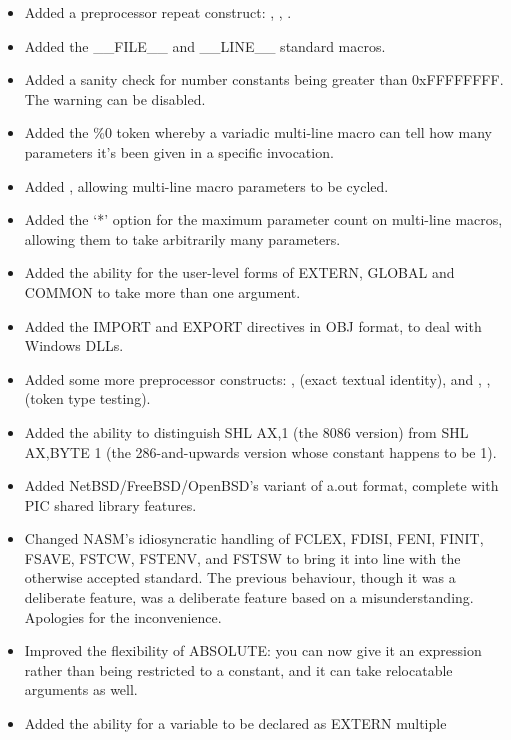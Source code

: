 \begin{itemize}
{        synonyms == and !=) plus low-precedence logical operators \&\&,
        \textasciicircum \textasciicircum and ||.}
    \item{Added a preprocessor repeat construct: , ,
        .}
    \item{Added the \_\_FILE\_\_ and \_\_LINE\_\_ standard macros.}
    \item{Added a sanity check for number constants being greater than
        0xFFFFFFFF. The warning can be disabled.}
    \item{Added the \%0 token whereby a variadic multi-line macro can tell how
        many parameters it's been given in a specific invocation.}
    \item{Added , allowing multi-line macro parameters to be cycled.}
    \item{Added the `*' option for the maximum parameter count on multi-line
        macros, allowing them to take arbitrarily many parameters.}
    \item{Added the ability for the user-level forms of EXTERN, GLOBAL and
        COMMON to take more than one argument.}
    \item{Added the IMPORT and EXPORT directives in OBJ format, to deal with
        Windows DLLs.}
    \item{Added some more preprocessor  constructs: ,
         (exact textual identity), and ,
        ,  (token type testing).}
    \item{Added the ability to distinguish SHL AX,1 (the 8086 version) from
        SHL AX,BYTE 1 (the 286-and-upwards version whose constant happens to
        be 1).}
    \item{Added NetBSD/FreeBSD/OpenBSD's variant of a.out format, complete
        with PIC shared library features.}
    \item{Changed NASM's idiosyncratic handling of FCLEX, FDISI, FENI, FINIT,
        FSAVE, FSTCW, FSTENV, and FSTSW to bring it into line with the
        otherwise accepted standard. The previous behaviour, though it was a
        deliberate feature, was a deliberate feature based on a
        misunderstanding. Apologies for the inconvenience.}
    \item{Improved the flexibility of ABSOLUTE: you can now give it an
        expression rather than being restricted to a constant, and it can
        take relocatable arguments as well.}
    \item{Added the ability for a variable to be declared as EXTERN multiple
}
\end{itemize}
